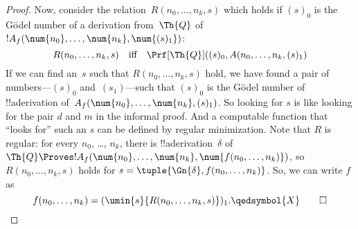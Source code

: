 \documentclass[../../../include/open-logic-section]{subfiles}
\begin{document}
\begin{proof}
Now, consider the relation~$R(n_0, \dots, n_k, s)$ which holds if
$(s)_0$ is the G\"odel number of a derivation from~$\Th{Q}$ of
$!A_f(\num{n_0}, \dots, \num{n_k}, \num{(s)_1})$:
\[
R(n_0, \dots, n_k, s) \quad\text{iff}\quad \Prf[\Th{Q}]((s)_0, A(n_0,
\dots, n_k, (s)_1)
\]
If we can find an~$s$ such that $R(n_0, \dots, n_k, s)$ hold, we have
found a pair of numbers---$(s)_0$ and~$(s_1)$---such that $(s)_0$ is
the G\"odel number of !!a{derivation} of~$A_f(\num{n_0}, \dots,
\num{n_k}, (s)_1)$. So looking for $s$ is like looking for the pair
$d$ and $m$ in the informal proof.  And a computable function that
``looks for'' such an $s$ can be defined by regular minimization.
Note that $R$ is regular: for every $n_0$, \dots, $n_k$, there is
!!a{derivation}~$\delta$ of $\Th{Q} \Proves !A_f(\num{n_0}, \dots,
\num{n_k}, \num{f(n_0, \dots, n_k)})$, so $R(n_0, \dots, n_k, s)$
holds for $s = \tuple{\Gn{\delta}, f(n_0, \dots, n_k)}$.  So, we can
write $f$ as
\[
f(n_0,\dots,n_{k}) = (\umin{s}{R(n_0, \dots, n_k, s)})_1.\qedsymbol{X}\qed
\]
\end{proof}
\end{document}
